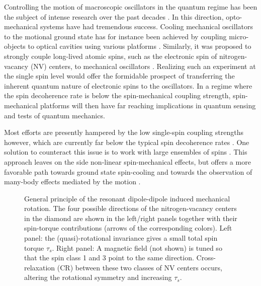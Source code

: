 \documentclass[preprintnumbers,amsmath,amssymb,superscriptaddress,twocolumn,showpacs]{revtex4-1}
\begin{document}
Controlling the motion of macroscopic oscillators in the quantum regime has been the subject of intense research over the past decades \cite{Teufel, Riedinger}.  In this direction, opto-mechanical systems have had tremendous success. Cooling mechanical oscillators to the motional ground state has for instance been achieved by coupling micro-objects to optical cavities using various platforms \cite{Aspelmeyer, Delic, Chan}. 
Similarly, it was proposed to strongly couple long-lived atomic spins, such as the electronic spin of nitrogen-vacancy (NV) centers, to mechanical oscillators \cite{Treutlein2014, Rabl, Lee_2017}. Realizing such an experiment at the single spin level would offer the formidable prospect of transferring the inherent quantum nature of electronic spins to the oscillators. In a regime where the spin decoherence rate is below the spin-mechanical coupling strength, spin-mechanical platforms will then have far reaching implications in quantum sensing and tests of quantum mechanics.

Most efforts are presently hampered by the low single-spin coupling strengths however, which are currently far below the typical spin decoherence rates \cite{Kolkowitz, Gieseler, DelordNat, Arcizet}.   
One solution to counteract this issue is to work with large ensembles of spins \cite{DelordNat}. This approach leaves on the side non-linear spin-mechanical effects, but offers a more favorable path towards ground state spin-cooling \cite{Rabl} and towards the observation of many-body effects mediated by the motion \cite{Wei, ma2016quantum}. 

\begin{figure}[!ht]
  \centering {}
  \caption{General principle of the resonant dipole-dipole induced mechanical rotation. The four possible directions of the nitrogen-vacancy centers in the diamond are shown in the left/right panels together with their spin-torque contributions (arrows of the corresponding colors). Left panel: the (quasi)-rotational invariance gives a small total spin torque $\tau_s$.
Right panel: A magnetic field (not shown) is tuned so that the spin class 1 and 3 point to the same direction. Cross-relaxation (CR) between these two classes of NV centers occurs, altering the rotational symmetry and increasing $\tau_s$. 
  }\label{principle}
\end{figure}
\end{document}

